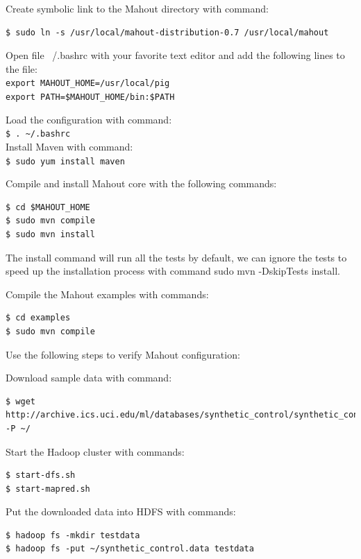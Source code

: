 Create symbolic link to the Mahout directory with command: 
\lstset{style=bashstyle}
\begin{lstlisting}
$ sudo ln -s /usr/local/mahout-distribution-0.7 /usr/local/mahout 
\end{lstlisting}

Open file ~/.bashrc with your favorite text editor and add the following lines to the file: \\
\verb|export MAHOUT_HOME=/usr/local/pig| \\
\verb|export PATH=$MAHOUT_HOME/bin:$PATH|

Load the configuration with command: \\
\verb|$ . ~/.bashrc| \\

Install Maven with command: \\
\verb|$ sudo yum install maven|

Compile and install Mahout core with the following commands:
\lstset{style=bashstyle}
\begin{lstlisting}
$ cd $MAHOUT_HOME
$ sudo mvn compile
$ sudo mvn install
\end{lstlisting}

The install command will run all the tests by default, we can ignore the tests to speed up the installation process with command sudo mvn -DskipTests install.

Compile the Mahout examples with commands:
\lstset{style=bashstyle}
\begin{lstlisting}
$ cd examples
$ sudo mvn compile
\end{lstlisting}

Use the following steps to verify Mahout configuration:

Download sample data with command:
\lstset{style=bashstyle}
\begin{lstlisting}
$ wget http://archive.ics.uci.edu/ml/databases/synthetic_control/synthetic_control.data -P ~/
\end{lstlisting}

Start the Hadoop cluster with commands:
\lstset{style=bashstyle}
\begin{lstlisting}
$ start-dfs.sh
$ start-mapred.sh
\end{lstlisting}

Put the downloaded data into HDFS with commands:
\lstset{style=bashstyle}
\begin{lstlisting}
$ hadoop fs -mkdir testdata
$ hadoop fs -put ~/synthetic_control.data testdata
\end{lstlisting}

